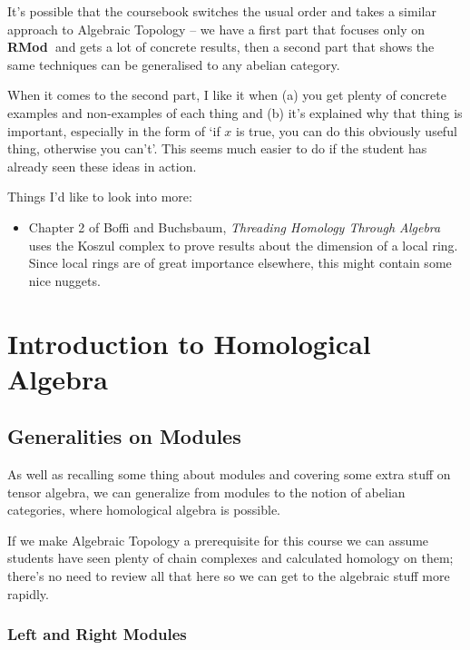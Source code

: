 \documentclass[oneside,english]{amsbook}
\numberwithin{section}{chapter}
\theoremstyle{plain}
\theoremstyle{definition}
\newcommand{\catname}[1]{{\normalfont\textbf{#1}}}
\newcommand{\RMod}{\catname{RMod\ }}
\begin{document}
		It's possible that the coursebook switches the usual order and takes a similar approach to Algebraic Topology -- we have a first part that focuses only on \RMod and gets a lot of concrete results, then a second part that shows the same techniques can be generalised to any abelian category.
		
		When it comes to the second part, I like it when (a) you get plenty of concrete examples and non-examples of each thing and (b) it's explained why that thing is important, especially in the form of `if $x$ is true, you can do this obviously useful thing, otherwise you can't'. This seems much easier to do if the student has already seen these ideas in action.
	
		Things I'd like to look into more:
		\begin{itemize}
			\item Chapter 2 of Boffi and Buchsbaum, \textit{Threading Homology Through Algebra} uses the Koszul complex to prove results about the dimension of a local ring. Since local rings are of great importance elsewhere, this might contain some nice nuggets.
		\end{itemize}

	\part{Introduction to Homological Algebra}
	
	\chapter{Generalities on Modules}
	
	As well as recalling some thing about modules and covering some extra stuff on tensor algebra, we can generalize from modules to the notion of abelian categories, where homological algebra is possible.
	
	If we make Algebraic Topology a prerequisite for this course we can assume students have seen plenty of chain complexes and calculated homology on them; there's no need to review all that here so we can get to the algebraic stuff more rapidly.
	
	\section{Left and Right Modules}
	
\end{document}
